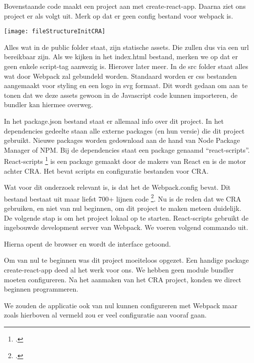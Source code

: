 

Bovenstaande code maakt een project aan met create-react-app. Daarna ziet ons project er als volgt uit. Merk op dat er geen config bestand voor webpack is.

\texttt{[image: fileStructureInitCRA]}

Alles wat in de public folder staat, zijn statische assets. Die zullen dus via een url bereikbaar zijn. Als we kijken in het index.html bestand, merken we op dat er geen enkele script-tag aanwezig is. Hierover later meer.
In de src folder staat alles wat door Webpack zal gebundeld worden. Standaard worden er css bestanden aangemaakt voor styling en een logo in svg formaat. Dit wordt gedaan om aan te tonen dat we deze assets gewoon in de Javascript code kunnen importeren, de bundler kan hiermee overweg. 



In het package.json bestand staat er allemaal info over dit project. In het dependencies gedeelte staan alle externe packages (en hun versie) die dit project gebruikt. Nieuwe packages worden gedownload aan de hand van Node Package Manager of NPM. Bij de dependencies staat een package genaamd “react-scripts”. React-scripts \footcite{https://github.com/facebook/create-react-app/tree/main/packages/react-scripts} is een package gemaakt door de makers van React en is de motor achter CRA. Het bevat scripts en configuratie bestanden voor CRA. 

Wat voor dit onderzoek relevant is, is dat het de Webpack.config bevat. Dit bestand bestaat uit maar liefst 700+ lijnen code \footcite{https://github.com/facebook/create-react-app/blob/main/packages/react-scripts/config/webpack.config.js}. Nu is de reden dat we CRA gebruiken, en niet van nul beginnen, om dit project te maken meteen duidelijk. 
De volgende stap is om het project lokaal op te starten. React-scripts gebruikt de ingebouwde development server van Webpack. We voeren volgend commando uit.

Hierna opent de browser en wordt de interface getoond. 

Om van nul te beginnen was dit project moeiteloos opgezet. Een handige package create-react-app deed al het werk voor ons. We hebben geen module bundler moeten configureren. Na het aanmaken van het CRA project, konden we direct beginnen programmeren. 

We zouden de applicatie ook van nul kunnen configureren met Webpack maar zoals hierboven al vermeld zou er veel configuratie aan vooraf gaan.

